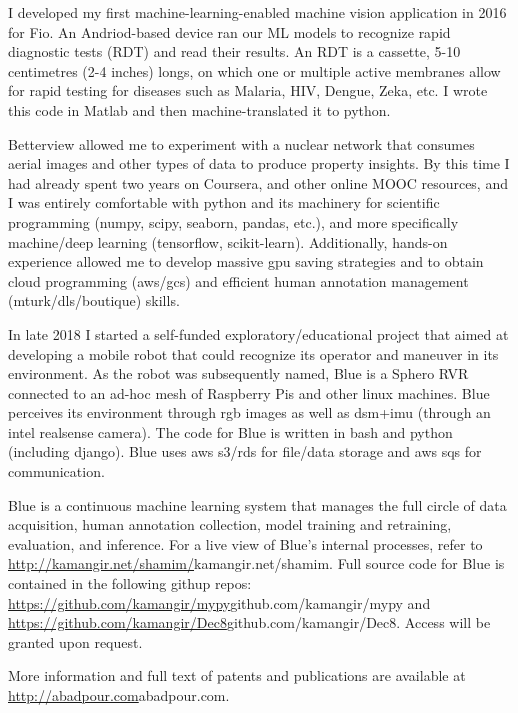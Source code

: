 I developed my first machine-learning-enabled machine vision application in 2016 for Fio. An Andriod-based device ran our ML
models to recognize rapid diagnostic tests (RDT) and read their results. An RDT is a cassette, 5-10 centimetres (2-4 inches) longs, on
which one or multiple active membranes allow for rapid testing for diseases such as Malaria, HIV, Dengue, Zeka, etc. I wrote this code in Matlab and then machine-translated it to python. 

Betterview allowed me to experiment with a nuclear network that consumes aerial images and other types of data to 
produce property insights. By this time I had already spent two years on Coursera, and other online MOOC resources, and I was entirely comfortable with python and its machinery for scientific programming (numpy, scipy, seaborn, pandas, etc.), and more specifically machine/deep learning (tensorflow, scikit-learn). Additionally, hands-on experience allowed me to develop massive gpu saving strategies and to obtain cloud programming (aws/gcs) and efficient human annotation management (mturk/dls/boutique) skills.

In late 2018 I started a self-funded exploratory/educational project that aimed at developing a mobile robot that could recognize its
operator and maneuver in its environment. As the robot was subsequently named, Blue is a Sphero RVR connected to an ad-hoc mesh of Raspberry Pis and other linux machines. Blue perceives its environment through rgb images as well as dsm+imu (through an intel realsense camera). The code for Blue is written in bash and python (including django). Blue uses aws s3/rds for file/data storage and aws sqs for communication. 

Blue is a continuous machine learning system that manages the full circle of data acquisition, human annotation collection, model training and
retraining, evaluation, and inference. For a live view of Blue's internal processes, refer to \url{http://kamangir.net/shamim/}{kamangir.net/shamim}. 
Full source code for Blue is contained in the following githup repos: \url{https://github.com/kamangir/mypy}{github.com/kamangir/mypy} 
and \url{https://github.com/kamangir/Dec8}{github.com/kamangir/Dec8}. Access will be granted upon request. 

\vspace{0.5cm}
More information and full text of patents and publications are available at \url{http://abadpour.com}{abadpour.com}.

\vspace{1.5cm}
